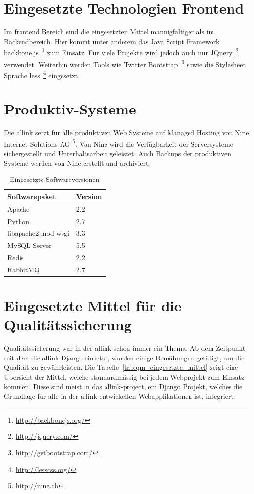 \section{Eingesetzte Technologien Frontend}
\label{sec:eingesetzte_technologien_frontend}
Im frontend Bereich sind die eingesetzten Mittel mannigfaltiger als im Backendbereich. Hier kommt unter anderem das  Java Script Framework backbone.js~\footnote{\url{http://backbonejs.org/}} zum Einsatz. Für viele Projekte wird jedoch auch nur JQuery~\footnote{\url{http://jquery.com/}} verwendet. Weiterhin werden Tools wie Twitter Bootstrap~\footnote{\url{http://getbootstrap.com/}} sowie die Stylesheet Sprache less~\footnote{\url{http://lesscss.org/}} eingesetzt.

\section{Produktiv-Systeme}
\label{sec:produktiv_systeme}
Die allink setzt für alle produktiven Web Systeme auf Managed Hosting von Nine Internet Solutions AG \footnote{http://nine.ch}. Von Nine wird die Verfügbarkeit der Serversysteme sichergestellt und Unterhaltsarbeit geleistet. Auch Backups der produktiven Systeme werden von Nine erstellt und archiviert.

\begin{table}[ht]
  \centering
  \begin{tabular}{ll}
  \toprule
    Softwarepaket & Version\\
  \midrule
    Apache & 2.2\\
  \hline
    Python & 2.7\\
  \hline
    libapache2-mod-wsgi & 3.3\\
  \hline
    MySQL Server & 5.5\\
  \hline
    Redis & 2.2\\
  \hline
    RabbitMQ & 2.7\\
  \bottomrule
  \end{tabular}
  \caption{Eingesetzte Softwareversionen}
  \label{tab:eingesetzte_softwareversionen}
\end{table}

\section{Eingesetzte Mittel für die Qualitätssicherung}
\label{sec:eingesetzte_mittel_für_die_qualitätssicherung}
Qualitätssicherung war in der allink schon immer ein Thema. Ab dem Zeitpunkt seit dem die allink Django einsetzt, wurden einige Bemühungen getätigt, um die Qualität zu gewährleisten. Die Tabelle~\ref{tab:qm_eingesetzte_mittel} zeigt eine Übersicht der Mittel, welche standardmässig bei jedem Webprojekt zum Einsatz kommen. Diese sind meist in das allink-project, ein Django Projekt, welches die Grundlage für alle in der allink entwickelten Webapplikationen ist, integriert.

